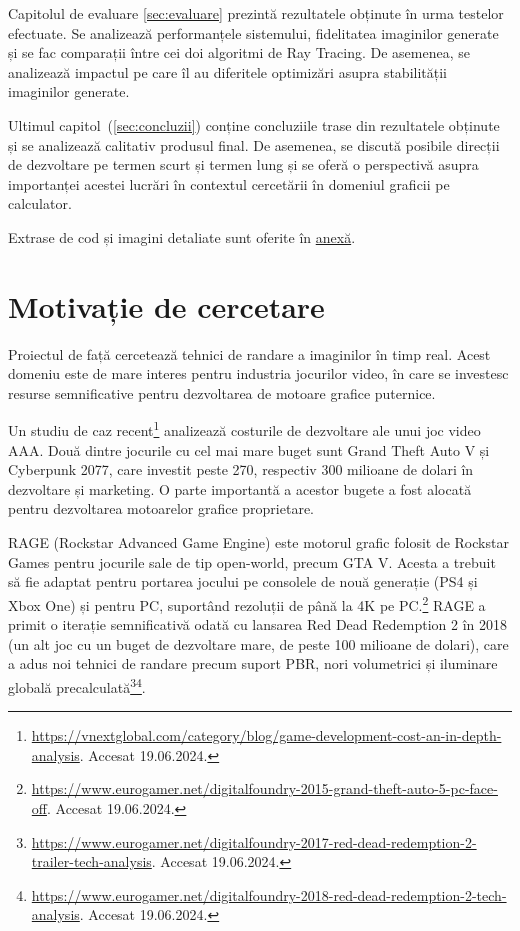 \documentclass[12pt,a4paper]{report}
\numberwithin{equation}{section} %
\begin{document}
Capitolul de evaluare \ref{sec:evaluare} prezintă rezultatele obținute
în urma testelor efectuate. Se analizează
performanțele sistemului, fidelitatea imaginilor generate și se fac comparații
între cei doi algoritmi de Ray Tracing. De asemenea, se analizează impactul pe
care îl au diferitele optimizări asupra stabilității imaginilor generate.

Ultimul capitol~(\ref{sec:concluzii}) conține concluziile trase din
rezultatele obținute și se analizează calitativ produsul final. De asemenea, se
discută posibile direcții de dezvoltare pe termen scurt și termen lung și se oferă o perspectivă asupra
importanței acestei lucrări în contextul cercetării în domeniul graficii pe calculator.

Extrase de cod și imagini detaliate sunt oferite în \hyperref[anexa]{anexă}.

\chapter{\label{sec:motivatie}Motivație de cercetare}

Proiectul de față cercetează tehnici de randare a imaginilor în timp real. Acest
domeniu este de mare interes pentru industria jocurilor video, în care se investesc
resurse semnificative pentru dezvoltarea de motoare grafice puternice.

Un studiu de caz
recent\footnote{\label{vnextglobal}\url{https://vnextglobal.com/category/blog/game-development-cost-an-in-depth-analysis}. Accesat 19.06.2024.}
analizează costurile de dezvoltare ale unui joc video AAA. Două dintre jocurile
cu cel mai mare buget sunt Grand Theft Auto V și Cyberpunk 2077, care investit
peste 270, respectiv 300 milioane de dolari în dezvoltare și marketing. O parte
importantă a acestor bugete a fost alocată pentru dezvoltarea motoarelor grafice
proprietare.

RAGE (Rockstar Advanced Game Engine) este motorul grafic folosit
de Rockstar Games pentru jocurile sale de tip open-world, precum GTA V. Acesta a
trebuit să fie adaptat pentru portarea jocului pe consolele de nouă generație
(PS4 și Xbox One) și pentru PC, suportând rezoluții de până la 4K pe PC.\footnote{\url{https://www.eurogamer.net/digitalfoundry-2015-grand-theft-auto-5-pc-face-off}. Accesat 19.06.2024.}
RAGE a primit o iterație semnificativă odată cu lansarea Red Dead Redemption 2 în 2018
(un alt joc cu un buget de dezvoltare mare, de peste 100 milioane de dolari),
care a adus noi tehnici de randare precum suport PBR, nori volumetrici și iluminare globală
precalculată\footnote{\url{https://www.eurogamer.net/digitalfoundry-2017-red-dead-redemption-2-trailer-tech-analysis}. Accesat 19.06.2024.}\footnote{\url{https://www.eurogamer.net/digitalfoundry-2018-red-dead-redemption-2-tech-analysis}. Accesat 19.06.2024.}.
\end{document}
